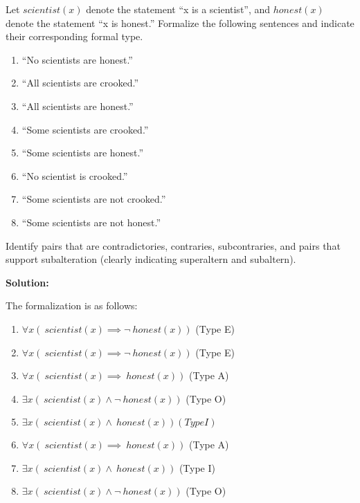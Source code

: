 \documentclass[12pt]{article}
\begin{document}
\noindent Let $scientist(x)$ denote the statement ``x is a scientist'', and $honest(x)$ denote the statement ``x is honest.'' Formalize the following sentences and indicate their corresponding formal type.

\begin{enumerate}
\item ``No scientists are honest.''

\item ``All scientists are crooked.''

\item ``All scientists are honest.''

\item ``Some scientists are crooked.''

\item ``Some scientists are honest.''

\item ``No scientist is crooked.''

\item ``Some scientists are not crooked.''

\item ``Some scientists are not honest.''

\end{enumerate}

\noindent Identify pairs that are contradictories, contraries, subcontraries, and pairs that support subalteration (clearly indicating superaltern and subaltern).

\bigskip
\noindent \textbf{Solution:}

\noindent The formalization is as follows:

\begin{enumerate}
\item $\forall x (~scientist(x) \implies \neg~honest(x))$ (Type E)
\item $\forall x (~scientist(x) \implies \neg~honest(x))$ (Type E)
\item $\forall x (~scientist(x) \implies ~honest(x))$ (Type A)
\item $\exists x (~scientist(x) \wedge \neg~honest(x))$ (Type O)
\item $\exists x (~scientist(x) \wedge ~honest(x)) (Type I)$
\item $\forall x (~scientist(x) \implies ~honest(x))$ (Type A)
\item $\exists x (~scientist(x) \wedge ~honest(x))$ (Type I)
\item $\exists x (~scientist(x) \wedge \neg~honest(x))$ (Type O)
\end{enumerate}
\end{document}
